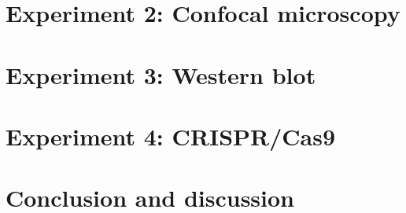 \documentclass{article}
\begin{document}
\section*{Experiment 2: Confocal microscopy}



\newpage
\section*{Experiment 3: Western blot}

\newpage
\section*{Experiment 4: CRISPR/Cas9}


\newpage
\section*{Conclusion and discussion}









\end{document}
